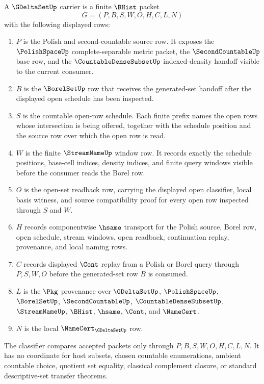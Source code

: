 \begin{definition}
\label{def:g-delta-set-carrier}
A $\GDeltaSetUp$ carrier is a finite $\BHist$ packet
$$
G=(P,B,S,W,O,H,C,L,N)
$$
with the following displayed rows:
\begin{enumerate}
\item $P$ is the Polish and second-countable source row. It exposes the $\PolishSpaceUp$ complete-separable metric packet, the $\SecondCountableUp$ base row, and the $\CountableDenseSubsetUp$ indexed-density handoff visible to the current consumer.
\item $B$ is the $\BorelSetUp$ row that receives the generated-set handoff after the displayed open schedule has been inspected.
\item $S$ is the countable open-row schedule. Each finite prefix names the open rows whose intersection is being offered, together with the schedule position and the source row over which the open row is read.
\item $W$ is the finite $\StreamNameUp$ window row. It records exactly the schedule positions, base-cell indices, density indices, and finite query windows visible before the consumer reads the Borel row.
\item $O$ is the open-set readback row, carrying the displayed open classifier, local basis witness, and source compatibility proof for every open row inspected through $S$ and $W$.
\item $H$ records componentwise $\hsame$ transport for the Polish source, Borel row, open schedule, stream windows, open readback, continuation replay, provenance, and local naming rows.
\item $C$ records displayed $\Cont$ replay from a Polish or Borel query through $P,S,W,O$ before the generated-set row $B$ is consumed.
\item $L$ is the $\Pkg$ provenance over $\GDeltaSetUp$, $\PolishSpaceUp$, $\BorelSetUp$, $\SecondCountableUp$, $\CountableDenseSubsetUp$, $\StreamNameUp$, $\BHist$, $\hsame$, $\Cont$, and $\NameCert$.
\item $N$ is the local $\NameCert_{\GDeltaSetUp}$ row.
\end{enumerate}
The classifier compares accepted packets only through $P,B,S,W,O,H,C,L,N$. It has no coordinate for host subsets, chosen countable enumerations, ambient countable choice, quotient set equality, classical complement closure, or standard descriptive-set transfer theorems.
\end{definition}

